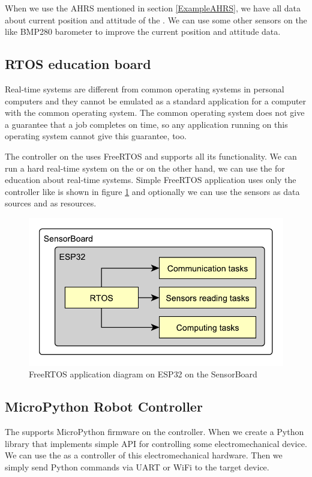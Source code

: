 When we use the \ac{AHRS} mentioned in section \ref{ExampleAHRS}, we have all data about current position and attitude of the . We can use some other sensors on the  like BMP280 barometer \cite{bosch:BMP280} to improve the current position and attitude data.

\subsection{RTOS education board}
Real-time systems are different from common operating systems in personal computers and they cannot be emulated as a standard application for a computer with the common operating system. The common operating system does not give a guarantee that a job completes on time, so any application running on this operating system cannot give this guarantee, too.

The  controller on the  uses FreeRTOS and supports all its functionality. \cite{ESP32FreeRTOS} We can run a hard real-time system on the  or on the other hand, we can use the  for education about real-time systems. Simple FreeRTOS application uses only the  controller like is shown in figure \ref{UEFreeRTOS} and optionally we can use the sensors as data sources and as resources.

\begin{figure}
    \centering
    \caption{FreeRTOS application diagram on ESP32 on the SensorBoard}
    \label{UEFreeRTOS}
    \includegraphics[scale=1]{img/UsageExamplesRTOS.pdf}
\end{figure}

\subsection{MicroPython Robot Controller}
The  supports MicroPython firmware \cite{MicroPython} on the  controller. When we create a Python library that implements simple \ac{API} for controlling some electromechanical device. We can use the  as a controller of this electromechanical hardware. Then we simply send Python commands via UART or WiFi to the target device.

